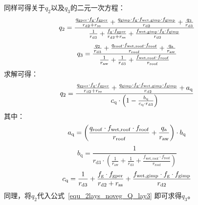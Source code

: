 同样可得关于$q_{2}$以及$q_{3}$的二元一次方程：
\begin{equation}
  q_{2} = \\
  \frac{\frac{q_{\mathrm{gper}} \cdot f_{\mathrm{g}} \cdot f_{\mathrm{gper}}}{r_{\mathrm{d2}} + r_{\mathrm{ss}}} + \frac{q_{\mathrm{gimp}} \cdot f_{\mathrm{g}} \cdot f_{\mathrm{wet,gimp}} \cdot f_{\mathrm{gimp}}}{r_{\mathrm{d2}}} + \frac{q_{3}}{r_{\mathrm{d3}}}}{\frac{1}{r_{\mathrm{d3}}} + \frac{f_{\mathrm{g}} \cdot f_{\mathrm{gper}}}{r_{\mathrm{d2}} + r_{\mathrm{ss}}} + \frac{f_{\mathrm{wet,gimp}} \cdot f_{\mathrm{g}} \cdot f_{\mathrm{gimp}}}{r_{\mathrm{d2}}}}
\end{equation}
%
\begin{equation}\label{equ_2lays_noveg_Q_lay3}
  q_{3} = \frac{\frac{q_{2}}{r_{\mathrm{d3}}} + \frac{q_{\mathrm{roof}} \cdot f_{\mathrm{wet,roof}} \cdot f_{\mathrm{roof}}}{r_{\mathrm{roof}}} + \frac{q_{\rm a}}{r_{\mathrm{aw}}}}{\frac{1}{r_{\mathrm{aw}}} + \frac{1}{r_{\mathrm{d3}}} + \frac{f_{\mathrm{wet,roof}} \cdot f_{\mathrm{roof}}}{r_{\mathrm{roof}}}}
\end{equation}
求解可得：
\begin{equation}
  q_{2} = \\
  \frac{\frac{q_{\mathrm{gper}} \cdot f_{\mathrm{g}} \cdot f_{\mathrm{gper}}}{r_{\mathrm{d2}}+r_{\mathrm{ss}}} + \frac{q_{\mathrm{gimp}} \cdot f_{\mathrm{g}} \cdot f_{\mathrm{wet,gimp}} \cdot f_{\mathrm{gimp}}}{r_{\mathrm{d2}} } + a_{\mathrm{q}}}{c_{\mathrm{q}} \cdot \left( 1 - \frac{b_{\mathrm{q}}}{c_{\mathrm{q}} \cdot r_{\mathrm{d3}}}\right)}
\end{equation}
%
其中：
\begin{equation}
  a_{\mathrm{q}}= \left(\frac{q_{\mathrm{roof}} \cdot f_{\mathrm{wet,roof}} \cdot f_{\mathrm{roof}}}{r_{\mathrm{roof}}} + \frac{q_{\rm a}}{r_{\mathrm{aw}}}\right) \cdot b_{\mathrm{q}}
\end{equation}
%
\begin{equation}
  b_{\mathrm{q}} = \frac{1}{r_{\mathrm{d3}} \cdot \left( \frac{1}{r_{\mathrm{aw}}} + \frac{1}{r_{\mathrm{d3}}} + \frac{f_{\mathrm{wet,roof}} \cdot f_{\mathrm{roof}}}{r_{\mathrm{roof}}} \right)}
\end{equation}
%
\begin{equation}
  c_{\mathrm{q}} = \frac{1}{r_{\mathrm{d3}}}+\frac{f_{\rm g} \cdot f_{\mathrm{gper}}}{r_{\mathrm{d2}}+r_{\mathrm{ss}}} + \frac{f_{\mathrm{wet,gimp}} \cdot f_{\rm g} \cdot f_{\mathrm{gimp}}}{r_{\mathrm{d2}}}
\end{equation}
同理，将$q_{2}$代入公式~\eqref{equ_2lays_noveg_Q_lay3} 即可求得$q_{3}$。

